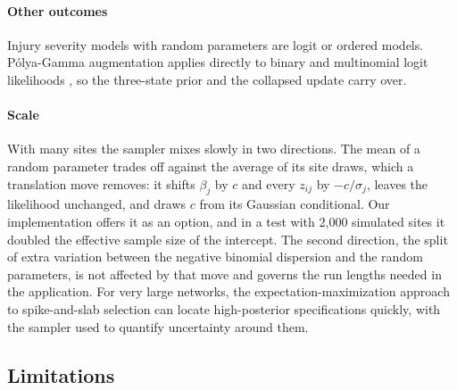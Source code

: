 \paragraph{Other outcomes} Injury severity models with random parameters are logit or ordered models. P\'olya-Gamma augmentation applies directly to binary and multinomial logit likelihoods \citep{polson2013bayesian}, so the three-state prior and the collapsed update carry over.

\paragraph{Scale} With many sites the sampler mixes slowly in two directions. The mean of a random parameter trades off against the average of its site draws, which a translation move \citep{liu2000generalised} removes: it shifts $\beta_j$ by $c$ and every $z_{ij}$ by $-c/\sigma_j$, leaves the likelihood unchanged, and draws $c$ from its Gaussian conditional. Our implementation offers it as an option, and in a test with 2{,}000 simulated sites it doubled the effective sample size of the intercept. The second direction, the split of extra variation between the negative binomial dispersion and the random parameters, is not affected by that move and governs the run lengths needed in the application. For very large networks, the expectation-maximization approach to spike-and-slab selection \citep{rockova2014emvs, rockova2018spike} can locate high-posterior specifications quickly, with the sampler used to quantify uncertainty around them.

\subsection{Limitations}

